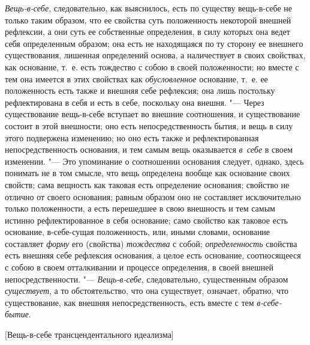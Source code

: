 {\em Вещь-в-себе}, следовательно, как выяснилось, есть
по существу вещь-в-себе не только таким образом, что ее свойства суть
положенность некоторой внешней рефлексии, а они суть ее собственные
определения, в силу которых она ведет себя определенным образом; она есть
не находящаяся по ту сторону ее внешнего существования, лишенная
определений основа, а наличествует в своих свойствах, как основание, т.~е.
есть тождество с собою в своей положенности; но вместе с тем она имеется в
этих свойствах как {\em обусловленное} основание, т.~е.
ее положенность есть также и внешняя себе рефлексия; она лишь постольку
рефлектирована в себя и есть в себе, поскольку она внешня. "--- Через
существование вещь-в-себе вступает во внешние соотношения, и существование
состоит в этой внешности; оно есть непосредственность бытия, и вещь в силу
этого подвержена изменению; но оно есть также и рефлектированная
непосредственность основания, и тем самым вещь оказывается
{\em в~себе} в своем изменении. "--- Это упоминание о
соотношении основания следует, однако, здесь понимать не в том смысле, что
вещь определена вообще как основание своих свойств; сама вещность как
таковая есть определение основания; свойство не отлично от своего
основания; равным образом оно не составляет исключительно только
положенности, а есть перешедшее в свою внешность и тем самым истинно
рефлектированное в себя основание; само свойство как таковое есть
основание, в-себе-сущая положенность, или, иными словами, основание
составляет {\em форму} его (свойства) {\em тождества} с собой;
{\em определенность} свойства есть внешняя себе
рефлексия основания, а целое есть основание, соотносящееся с собою в своем
отталкивании и процессе определения, в своей внешней непосредственности. "---
{\em Вещь-в-себе}, следовательно, существенным образом
{\em существует}, а то обстоятельство, что она
существует, означает, обратно, что существование, как внешняя
непосредственность, есть вместе с тем {\em в-себе-бытие}.

%
  {[Вещь-в-себе трансцендентального идеализма]}

